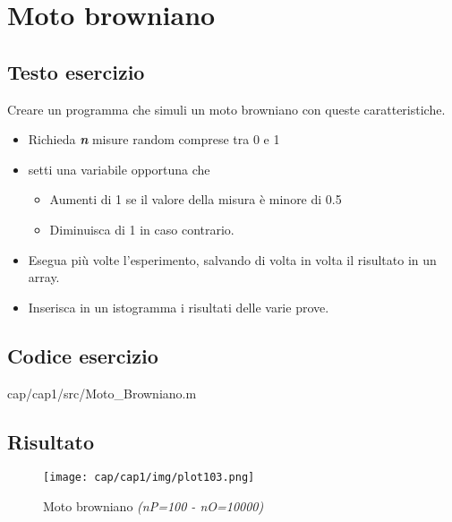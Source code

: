 \section{Moto browniano}

\subsection{Testo esercizio}
Creare un programma che simuli un moto browniano con queste caratteristiche.
\begin{itemize}

    \item Richieda \textit{\textbf{n}} misure random comprese tra 0 e 1
    \item setti una variabile opportuna che
    \begin{itemize}
        \item Aumenti di 1 se il valore della misura è minore di 0.5
        \item Diminuisca di 1 in caso contrario.
    \end{itemize}
    \item Esegua più volte l'esperimento, salvando di volta in volta il risultato in un array.
    \item Inserisca in un istogramma i risultati delle varie prove.
    
\end{itemize}
\pagebreak
\subsection{Codice esercizio}

{cap/cap1/src/Moto_Browniano.m}

\subsection{Risultato}
\begin{figure}[h]
    \centering
    \texttt{[image: cap/cap1/img/plot103.png]}
    \caption{Moto browniano \textit{(nP=100 - nO=10000)}}
    \label{fig:plot103}
    
\end{figure}


